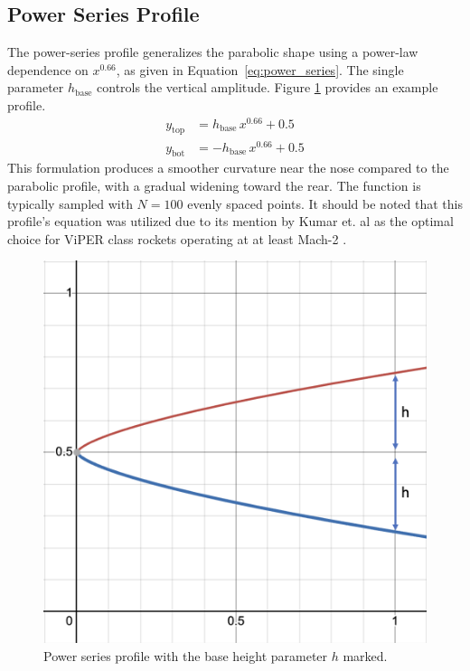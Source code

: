 \documentclass[11pt]{article}
\begin{document}
\subsection{Power Series Profile}
The power-series profile generalizes the parabolic shape using a power-law dependence on $x^{0.66}$, as given in Equation~\ref{eq:power_series}. The single parameter $h_{\text{base}}$ controls the vertical amplitude. Figure \ref{fig:power} provides an example profile.
\begin{subequations} \label{eq:power_series}
\begin{align}
y_{\text{top}} &= h_{\text{base}}\,x^{0.66} + 0.5 \label{eq:power_series_top}\\
y_{\text{bot}} &= -h_{\text{base}}\,x^{0.66} + 0.5 \label{eq:power_series_bot}
\end{align}
\end{subequations}
This formulation produces a smoother curvature near the nose compared to the parabolic profile, with a gradual widening toward the rear. The function is typically sampled with $N = 100$ evenly spaced points. It should be noted that this profile's equation was utilized due to its mention by Kumar et. al as the optimal choice for ViPER class rockets operating at at least Mach-2 \cite{gDesignCFDAnalysis2020}.
\begin{figure}[H]
\centering
    \includegraphics[width=0.5\linewidth]{power.png}
    \caption{Power series profile with the base height parameter $h$ marked.}
\label{fig:power}
\end{figure}
\end{document}
